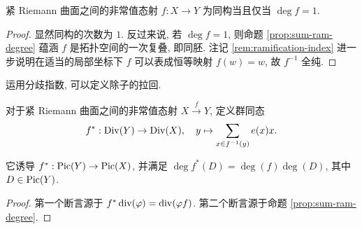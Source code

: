\begin{proposition}\label{prop:degree-1}
	紧 Riemann 曲面之间的非常值态射 $f: X \to Y$ 为同构当且仅当 $\deg f = 1$.
\end{proposition}
\begin{proof}
	显然同构的次数为 $1$. 反过来说, 若 $\deg f = 1$, 则命题 \ref{prop:sum-ram-degree} 蕴涵 $f$ 是拓扑空间的一次复叠, 即同胚. 注记 \ref{rem:ramification-index} 进一步说明在适当的局部坐标下 $f$ 可以表成恒等映射 $f(w)=w$, 故 $f^{-1}$ 全纯.
\end{proof}

运用分歧指数, 可以定义除子的拉回.
\begin{definition-proposition}\label{def:divisor-pullback}
	对于紧 Riemann 曲面之间的非常值态射 $X \xrightarrow{f} Y$, 定义群同态
	\[ f^*: \operatorname{Div}(Y) \to \operatorname{Div}(X), \quad y \mapsto \sum_{x \in f^{-1}(y)} e(x) x. \]
	
	它诱导 $f^*: \operatorname{Pic}(Y) \to \operatorname{Pic}(X)$, 并满足 $\deg f^*(D) = \deg(f)\deg(D)$, 其中 $D \in \operatorname{Pic}(Y)$.
\end{definition-proposition}
\begin{proof}
	第一个断言源于 $f^* \operatorname{div}(\varphi) = \operatorname{div}(\varphi f)$. 第二个断言源于命题 \ref{prop:sum-ram-degree}.
\end{proof}

